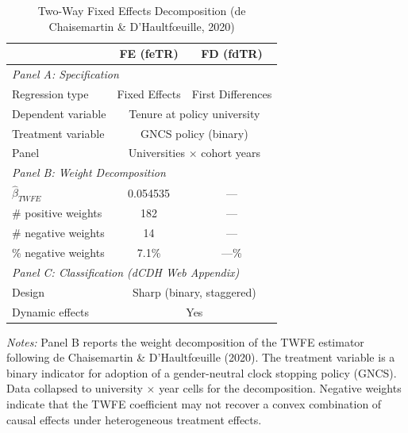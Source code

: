 \begin{table}[htbp]
\centering
\caption{Two-Way Fixed Effects Decomposition (de Chaisemartin \& D'Haultf\oe uille, 2020)}
\label{tab:antecol_twfe}
\begin{tabular}{lcc}
\toprule
 & FE (feTR) & FD (fdTR) \\
\midrule
\multicolumn{3}{l}{\textit{Panel A: Specification}} \\[3pt]
Regression type & Fixed Effects & First Differences \\
Dependent variable & \multicolumn{2}{c}{Tenure at policy university} \\
Treatment variable & \multicolumn{2}{c}{GNCS policy (binary)} \\
Panel & \multicolumn{2}{c}{Universities $\times$ cohort years} \\[6pt]
\multicolumn{3}{l}{\textit{Panel B: Weight Decomposition}} \\[3pt]
$\hat{\beta}_{TWFE}$ & 0.054535 & --- \\
\# positive weights & 182 & --- \\
\# negative weights & 14 & --- \\
\% negative weights &   7.1\% & ---\% \\[6pt]
\multicolumn{3}{l}{\textit{Panel C: Classification (dCDH Web Appendix)}} \\[3pt]
Design & \multicolumn{2}{c}{Sharp (binary, staggered)} \\
Dynamic effects & \multicolumn{2}{c}{Yes} \\
\bottomrule
\end{tabular}

\vspace{6pt}
\begin{minipage}{0.92\textwidth}
\footnotesize
\textit{Notes:} Panel B reports the weight decomposition of the TWFE estimator 
following de Chaisemartin \& D'Haultf\oe uille (2020). 
The treatment variable is a binary indicator for adoption of a gender-neutral 
clock stopping policy (GNCS). Data collapsed to university $\times$ year cells 
for the decomposition. 
Negative weights indicate that the TWFE coefficient may not recover 
a convex combination of causal effects under heterogeneous treatment effects.
\end{minipage}
\end{table}
